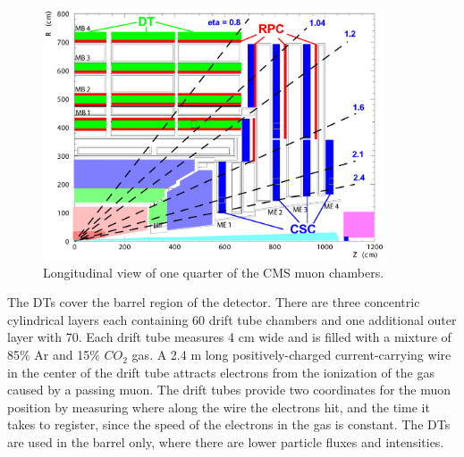 \begin{figure}[hbtp]
 \begin{center}
   \includegraphics[width=0.9\textwidth]{ch3_figs/cms_muonchamber.pdf}
   \caption[Longitudinal view of the CMS muon chambers]{Longitudinal view of one quarter of the CMS muon chambers.}
   \label{fig:cms_muonchamber}
 \end{center}
\end{figure}

The DTs cover the barrel region of the detector. There are three concentric cylindrical layers each containing 60 drift tube chambers and one additional outer layer with 70.
Each drift tube measures 4 cm wide and is filled with a mixture of 85$\%$ Ar and 15$\%$ $CO_{2}$ gas. A 2.4 m long positively-charged current-carrying wire in the center of the drift tube attracts electrons
from the ionization of the gas caused by a passing muon. The drift tubes provide two coordinates for the muon position by measuring where along the wire the
electrons hit, and the time it takes to register, since the speed of the electrons in the gas is constant. The DTs are used in the barrel only, where there are lower particle fluxes
and intensities. 


